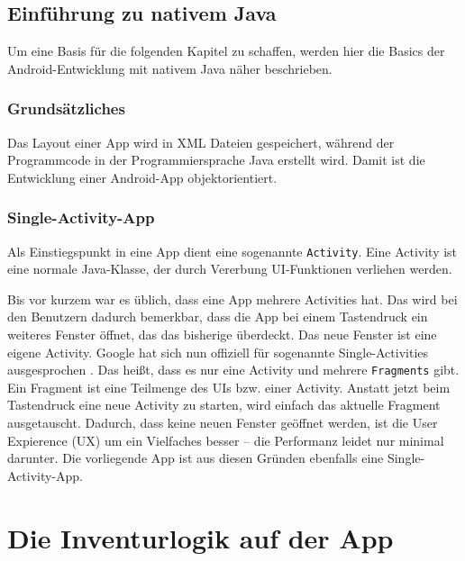 \hypertarget{einfuxfchrung-zu-nativem-java}{%
\section{Einführung zu nativem
Java}\label{einfuxfchrung-zu-nativem-java}}

Um eine Basis für die folgenden Kapitel zu schaffen, werden hier die
Basics der Android-Entwicklung mit nativem Java näher beschrieben.

\hypertarget{grundsuxe4tzliches}{%
\subsection{Grundsätzliches}\label{grundsuxe4tzliches}}

Das Layout einer App wird in XML Dateien gespeichert, während der
Programmcode in der Programmiersprache Java erstellt wird. Damit ist die
Entwicklung einer Android-App objektorientiert.

\hypertarget{single-activity-app}{%
\subsection{Single-Activity-App}\label{single-activity-app}}

Als Einstiegspunkt in eine App dient eine sogenannte \texttt{Activity}.
Eine Activity ist eine normale Java-Klasse, der durch Vererbung
UI-Funktionen verliehen werden.

Bis vor kurzem war es üblich, dass eine App mehrere Activities hat. Das
wird bei den Benutzern dadurch bemerkbar, dass die App \zB bei einem
Tastendruck ein weiteres Fenster öffnet, das das bisherige überdeckt.
Das neue Fenster ist eine eigene Activity. Google hat sich nun offiziell
für sogenannte Single-Activities ausgesprochen \cite{single-activity}.
Das heißt, dass es nur eine Activity und mehrere \texttt{Fragments}
gibt. Ein Fragment ist eine Teilmenge des UIs bzw. einer Activity.
Anstatt jetzt beim Tastendruck eine neue Activity zu starten, wird
einfach das aktuelle Fragment ausgetauscht. Dadurch, dass keine neuen
Fenster geöffnet werden, ist die User Expierence (UX) um ein Vielfaches
besser -- die Performanz leidet nur minimal darunter. Die vorliegende
App ist aus diesen Gründen ebenfalls eine Single-Activity-App.

\chapter{Die Inventurlogik auf der App}
\label{inventurlogik_auf_der_app}

